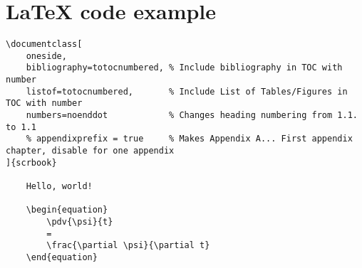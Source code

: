 \section{\LaTeX{} code example}


\begin{lstlisting}[style=latexstyle]
\documentclass[
	oneside,
	bibliography=totocnumbered, % Include bibliography in TOC with number
	listof=totocnumbered,       % Include List of Tables/Figures in TOC with number
	numbers=noenddot            % Changes heading numbering from 1.1. to 1.1
	% appendixprefix = true     % Makes Appendix A... First appendix chapter, disable for one appendix
]{scrbook}

	Hello, world!
	
	\begin{equation}
		\pdv{\psi}{t}
		=
		\frac{\partial \psi}{\partial t}
	\end{equation}
	

\end{lstlisting}
	
